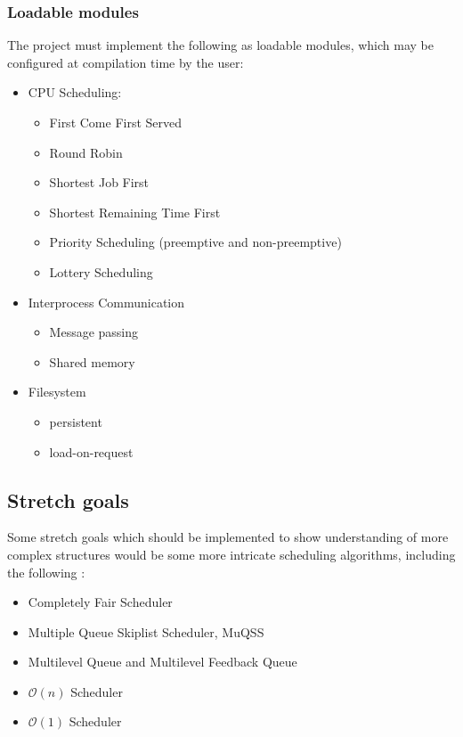 \documentclass[10pt,a4paper]{article}
\begin{document}
\subsubsection*{Loadable modules}
The project must implement the following as loadable modules, which may be
configured at compilation time by the user:
\begin{itemize}
    \item CPU Scheduling:
        \begin{itemize}
            \item First Come First Served
            \item Round Robin
            \item Shortest Job First
            \item Shortest Remaining Time First
            \item Priority Scheduling (preemptive and non-preemptive)
            \item Lottery Scheduling
        \end{itemize}
    \item Interprocess Communication
        \begin{itemize}
            \item Message passing
            \item Shared memory
        \end{itemize}
    \item Filesystem
        \begin{itemize}
            \item persistent
            \item load-on-request
        \end{itemize}
\end{itemize}

\subsection*{Stretch goals}
Some stretch goals which should be implemented to show understanding of more
complex structures would be some more intricate scheduling algorithms, including
the following \cite{CFS,BFS,DinosaurCPU,O(n)Scheduler,O(1)Scheduler}:
\begin{itemize}
    \item Completely Fair Scheduler
    \item Multiple Queue Skiplist Scheduler, MuQSS
    \item Multilevel Queue and Multilevel Feedback Queue
    \item $\mathcal{O}(n)$ Scheduler
    \item $\mathcal{O}(1)$ Scheduler
\end{itemize}
\end{document}
